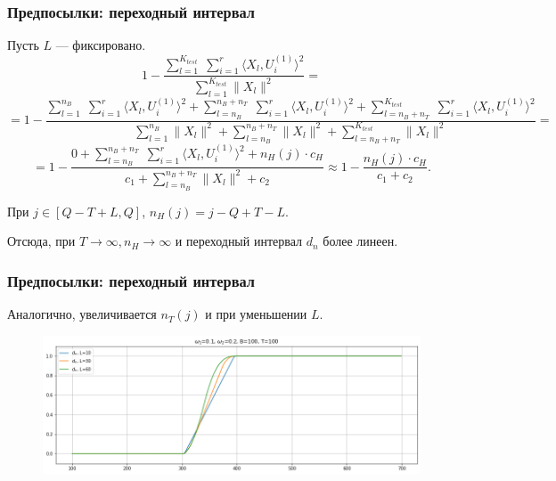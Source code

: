 \documentclass[11pt]{beamer}
\begin{document}
	\begin{frame}
		\frametitle{Предпосылки: переходный интервал}
		Пусть $ L $ --- фиксировано. 
		\small
		$$ 1 - \frac{\sum\limits_{l=1}^{K_{test}}\;\sum\limits_{i=1}^{r}\langle X_l, U_i^{(1)}\rangle^2}{\sum\limits_{l=1}^{K_{test}}\|X_l\|^2} = $$
		$$ = 1 - \frac{\sum\limits_{l=1}^{n_B}\;\sum\limits_{i=1}^{r}\langle X_l, U_i^{(1)}\rangle^2 + \sum\limits_{l=n_B}^{n_B + n_T}\;\sum\limits_{i=1}^{r}\langle X_l, U_i^{(1)}\rangle^2 + \sum\limits_{l=n_B + n_T}^{K_{test}}\;\sum\limits_{i=1}^{r}\langle X_l, U_i^{(1)}\rangle^2}{\sum\limits_{l=1}^{n_B}\|X_l\|^2 + \sum\limits_{l=n_B}^{n_B+n_T}\|X_l\|^2 + \sum\limits_{l=n_B+n_T}^{K_{test}}\|X_l\|^2} = $$
		$$ = 1 - \frac{0 + \sum\limits_{l=n_B}^{n_B+n_T}\;\sum\limits_{i=1}^{r}\langle X_l, U_i^{(1)}\rangle^2 + n_H(j) \cdot c_H}{c_1 + \sum\limits_{l=n_B}^{n_B+n_T}\|X_l\|^2 + c_2} \approx 1 - \frac{n_H(j) \cdot c_H}{c_1 + c_2}.$$
		
		При $ j \in [Q-T+L, Q] $, $ n_H(j) = j - Q + T - L $.
		
		Отсюда, при $ T \rightarrow \infty, n_H \rightarrow \infty $ и переходный интервал $ d_n $ более линеен.
	\end{frame}
	
	\begin{frame}
		\frametitle{Предпосылки: переходный интервал}
		Аналогично, увеличивается $ n_T(j) $ и при уменьшении $ L $.
		\begin{figure}[b]
			\centering
			\includegraphics[width=\linewidth]{imgs/row_linear_growth}
		\end{figure}
	\end{frame}
	
\end{document}
